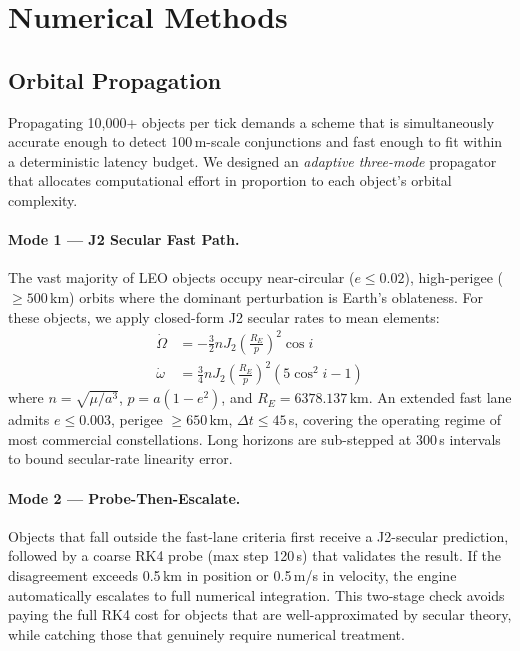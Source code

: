 \documentclass[10pt,twocolumn,letterpaper]{article}
\begin{document}
\section{Numerical Methods}\label{sec:methods}

\subsection{Orbital Propagation}

Propagating 10{,}000+ objects per tick demands a scheme that is
simultaneously accurate enough to detect 100\,m-scale conjunctions and
fast enough to fit within a deterministic latency budget.  We designed an
\emph{adaptive three-mode} propagator that allocates computational effort
in proportion to each object's orbital complexity.

\paragraph{Mode 1 --- J2 Secular Fast Path.}
The vast majority of LEO objects occupy near-circular ($e \leq 0.02$),
high-perigee ($\geq 500$\,km) orbits where the dominant perturbation is
Earth's oblateness.  For these objects, we apply closed-form J2 secular
rates to mean elements:
%
\begin{align}
  \dot{\Omega} &= -\frac{3}{2} n J_2 \!\left(\frac{R_E}{p}\right)^{\!2} \cos i \\
  \dot{\omega} &= \frac{3}{4} n J_2 \!\left(\frac{R_E}{p}\right)^{\!2} (5\cos^{2}\!i - 1)
\end{align}
%
where $n = \sqrt{\mu / a^3}$, $p = a(1-e^2)$, and $R_E = 6378.137$\,km.
An extended fast lane admits $e \leq 0.003$, perigee $\geq 650$\,km,
$\Delta t \leq 45$\,s, covering the operating regime of most commercial
constellations.  Long horizons are sub-stepped at 300\,s intervals to
bound secular-rate linearity error.

\paragraph{Mode 2 --- Probe-Then-Escalate.}
Objects that fall outside the fast-lane criteria first receive a
J2-secular prediction, followed by a coarse RK4 probe (max step 120\,s)
that validates the result.  If the disagreement exceeds 0.5\,km in
position or 0.5\,m/s in velocity, the engine automatically escalates to
full numerical integration.  This two-stage check avoids paying the full
RK4 cost for objects that are well-approximated by secular theory, while
catching those that genuinely require numerical treatment.
\end{document}
